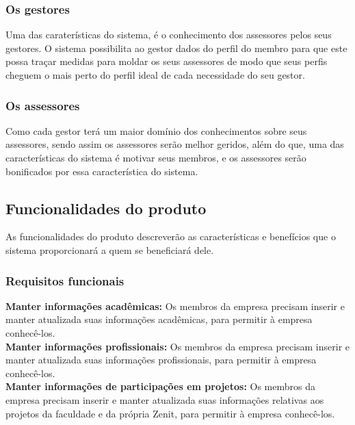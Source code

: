 \begin{anexosenv}
\subsubsection[Os gestores]{Os gestores}

Uma das caraterísticas do sistema, é o conhecimento dos assessores pelos seus gestores. O sistema possibilita ao gestor dados do perfil do membro para que este  possa traçar medidas para moldar os seus assessores de modo que seus perfis  cheguem o mais perto do perfil ideal de cada necessidade do seu gestor.\\

\subsubsection[Os assessores]{Os assessores}

Como cada gestor terá um maior domínio dos conhecimentos sobre seus assessores, sendo assim os assessores serão melhor geridos, além do que, uma das características do sistema é motivar seus membros, e os assessores serão bonificados por essa característica do sistema.\\

\subsection[Funcionalidades do produto]{Funcionalidades do produto}

As funcionalidades do produto descreverão as características e benefícios que o sistema proporcionará a quem se beneficiará dele.\\

\subsubsection[Requisitos funcionais]{Requisitos funcionais}

\textbf{Manter informações acadêmicas:} Os membros da empresa precisam inserir e manter atualizada suas informações acadêmicas, para permitir à empresa conhecê-los.\\

\textbf{Manter informações profissionais:} Os membros da empresa precisam inserir e manter atualizada suas informações profissionais, para permitir à empresa conhecê-los.\\

\textbf{Manter informações de participações em projetos:} Os membros da empresa precisam inserir e manter atualizada suas informações relativas aos projetos da faculdade e da própria Zenit, para permitir à empresa conhecê-los.\\


\end{anexosenv}
